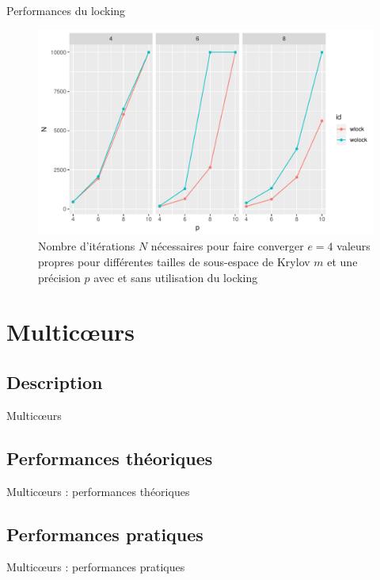 \documentclass[9.5pt]{beamer}
\begin{document}
		\begin{frame}{Performances du locking}
			\begin{figure}
				\centering
				\includegraphics[width=0.8\linewidth, keepaspectratio]{../rapport/plots/Nvsp_complock.pdf}
				\caption{Nombre d'itérations $N$ nécessaires pour faire converger $e = 4$ valeurs propres pour différentes tailles de sous-espace de Krylov $m$ et une précision $p$ avec et sans utilisation du locking \label{fig:Nvsp_complock}}
			\end{figure}
		\end{frame}

\section{Multic\oe{}urs}
		\subsection{Description}
		\begin{frame}{Multic\oe{}urs}

		\end{frame}

	\subsection{Performances théoriques}
		\begin{frame}{Multic\oe{}urs : performances théoriques}

		\end{frame}

	\subsection{Performances pratiques}
		\begin{frame}{Multic\oe{}urs : performances pratiques}

		\end{frame}
\end{document}
